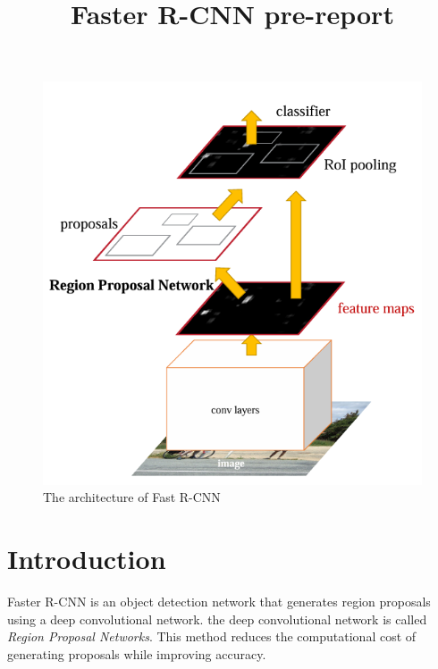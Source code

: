 \documentclass[extendedabs]{bmvc2k}
\begin{document}
\title{Faster R-CNN pre-report}

 

\maketitle
\noindent


\begin{figure}[t]
	\includegraphics[width=\linewidth]{images/fasterrcnnarch.PNG}
	\caption{
		The architecture of Fast R-CNN\cite{fasterrcnn}}
	\vspace{-2mm}
 \label{fig:fasterrcnnarch}
\end{figure}





\section{Introduction}
Faster R-CNN\cite{fasterrcnn} is an object detection network that generates region proposals using a deep convolutional network. the deep convolutional network is called \textit{Region Proposal Networks}. This method reduces the computational cost of generating proposals while improving accuracy.
\end{document}
